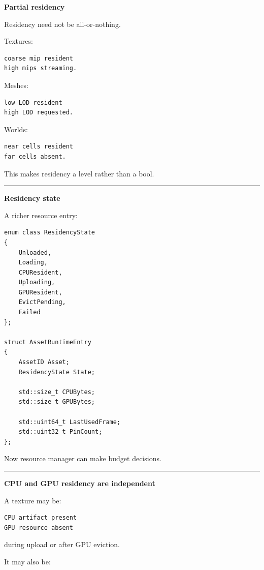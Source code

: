 \textbf{Partial residency}

Residency need not be all-or-nothing.

Textures:

\begin{verbatim}
coarse mip resident
high mips streaming.
\end{verbatim}

Meshes:

\begin{verbatim}
low LOD resident
high LOD requested.
\end{verbatim}

Worlds:

\begin{verbatim}
near cells resident
far cells absent.
\end{verbatim}

This makes residency a level rather than a bool.

\begin{center}\rule{0.5\linewidth}{0.5pt}\end{center}

\textbf{Residency state}

A richer resource entry:

\begin{verbatim}
enum class ResidencyState
{
    Unloaded,
    Loading,
    CPUResident,
    Uploading,
    GPUResident,
    EvictPending,
    Failed
};

struct AssetRuntimeEntry
{
    AssetID Asset;
    ResidencyState State;

    std::size_t CPUBytes;
    std::size_t GPUBytes;

    std::uint64_t LastUsedFrame;
    std::uint32_t PinCount;
};
\end{verbatim}

Now resource manager can make budget decisions.

\begin{center}\rule{0.5\linewidth}{0.5pt}\end{center}

\textbf{CPU and GPU residency are independent}

A texture may be:

\begin{verbatim}
CPU artifact present
GPU resource absent
\end{verbatim}

during upload or after GPU eviction.

It may also be:

